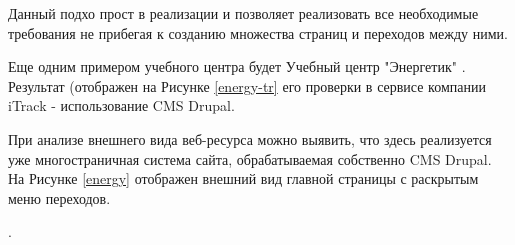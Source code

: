
    Данный подхо прост в реализации и позволяет реализовать все необходимые требования не прибегая к созданию множества страниц и переходов между ними.

    Еще одним примером учебного центра будет Учебный центр "Энергетик" \cite{energy}.
    Результат (отображен на Рисунке \ref{energy-tr} его проверки в сервисе компании iTrack - использование CMS Drupal.


    При анализе внешнего вида веб-ресурса можно выявить, что здесь реализуется уже многостраничная система сайта, обрабатываемая собственно CMS Drupal.
    На Рисунке \ref{energy} отображен внешний вид главной страницы с раскрытым меню переходов.

    .
